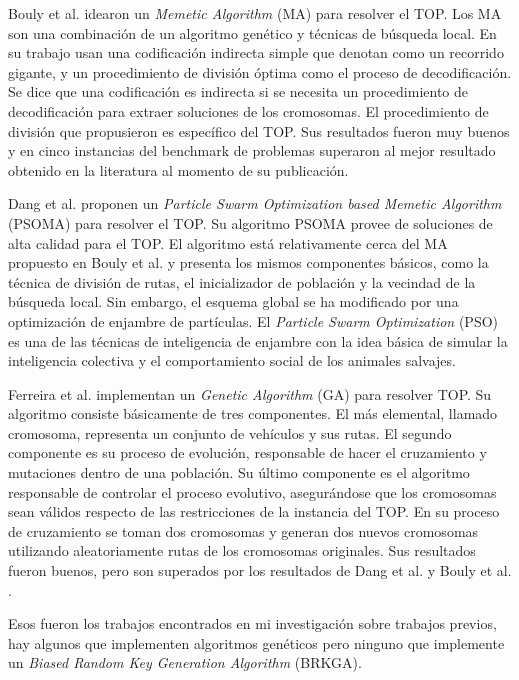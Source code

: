 \bigskip

Bouly et al. \cite{BoulyDangMoukrim} idearon un \textit{Memetic Algorithm} (MA) para resolver el TOP. Los MA son una combinación de un algoritmo genético y técnicas de búsqueda local. En su trabajo usan una codificación indirecta simple que denotan como un recorrido gigante, y un procedimiento de división óptima como el proceso de decodificación. Se dice que una codificación es indirecta si se necesita un procedimiento de decodificación para extraer soluciones de los cromosomas. El procedimiento de división que propusieron es específico del TOP. Sus resultados fueron muy buenos y en cinco instancias del benchmark de problemas superaron al mejor resultado obtenido en la literatura al momento de su publicación.

\bigskip

Dang et al. \cite{DangGuibadjMoukrim} proponen un \textit{Particle Swarm Optimization based Memetic Algorithm} (PSOMA) para resolver el TOP. Su algoritmo PSOMA provee de soluciones de alta calidad para el TOP. El algoritmo está relativamente cerca del MA propuesto en Bouly et al. \cite{BoulyDangMoukrim} y presenta los mismos componentes básicos, como la técnica de división de rutas, el inicializador de población y la vecindad de la búsqueda local. Sin embargo, el esquema global se ha modificado por una optimización de enjambre de partículas. El \textit{Particle Swarm Optimization} (PSO) es una de las técnicas de inteligencia de enjambre con la idea básica de simular la inteligencia colectiva y el comportamiento social de los animales salvajes.

\bigskip

Ferreira et al. \cite{FerreiraQuintasOliveiraPereiraDias} implementan un \textit{Genetic Algorithm} (GA) para resolver TOP. Su algoritmo consiste básicamente de tres componentes. El más elemental, llamado cromosoma, representa un conjunto de vehículos y sus rutas. El segundo componente es su proceso de evolución, responsable de hacer el cruzamiento y mutaciones dentro de una población. Su último componente es el algoritmo responsable de controlar el proceso evolutivo, asegurándose que los cromosomas sean válidos respecto de las restricciones de la instancia del TOP. En su proceso de cruzamiento se toman dos cromosomas y generan dos nuevos cromosomas utilizando aleatoriamente rutas de los cromosomas originales. Sus resultados fueron buenos, pero son superados por los resultados de Dang et al. \cite{DangGuibadjMoukrim} y Bouly et al. \cite{BoulyDangMoukrim}.

\bigskip

Esos fueron los trabajos encontrados en mi investigación sobre trabajos previos, hay algunos que implementen algoritmos genéticos pero ninguno que implemente un \textit{Biased Random Key Generation Algorithm} (BRKGA).









